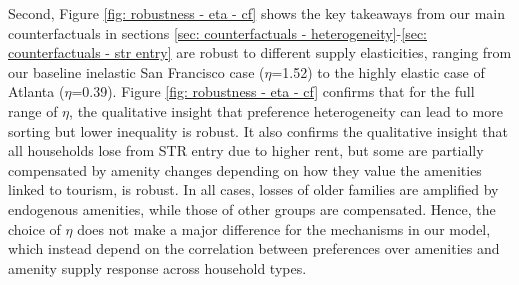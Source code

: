 \documentclass[11pt]{article}
\begin{document}
 Second, Figure \ref{fig: robustness - eta - cf} shows the key takeaways from our main counterfactuals in sections \ref{sec: counterfactuals - heterogeneity}-\ref{sec: counterfactuals - str entry} are robust to different supply elasticities, ranging from our baseline inelastic San Francisco case ($\eta$=1.52) to the highly elastic case of Atlanta ($\eta$=0.39). Figure \ref{fig: robustness - eta - cf} confirms that for the full range of $\eta$, the qualitative insight that preference heterogeneity can lead to more sorting but lower inequality is robust. It also confirms the qualitative insight that all households lose from STR entry due to higher rent, but some are partially compensated by amenity changes depending on how they value the amenities linked to tourism, is robust. In all cases, losses of older families are amplified by endogenous amenities, while those of other groups are compensated. Hence, the choice of $\eta$ does not make a major difference for the mechanisms in our model, which instead depend on the correlation between preferences over amenities and amenity supply response across household types.
\end{document}
